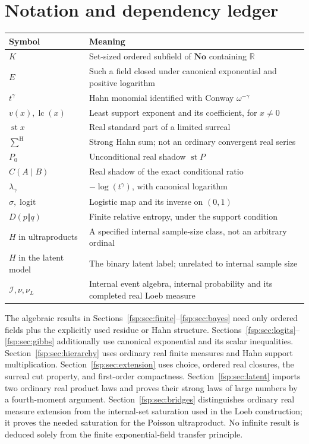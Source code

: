 \documentclass[11pt,a4paper]{article}
\numberwithin{equation}{section}
\theoremstyle{definition}
\theoremstyle{remark}
\newcommand{\R}{\mathbb R}
\newcommand{\No}{\mathbf{No}}
\newcommand{\st}{\operatorname{st}}
\newcommand{\lc}{\operatorname{lc}}
\newcommand{\logit}{\operatorname{logit}}
\newcommand{\hsum}{\mathop{\sum}\nolimits^{\mathrm H}}
\begin{document}
\appendix
\section{Notation and dependency ledger}
\label{fsp:app:ledger}

\begin{center}
\small
\begin{tabularx}{\textwidth}{@{}lX@{}}
\toprule
Symbol & Meaning\\
\midrule
$K$ & Set-sized ordered subfield of $\No$ containing $\R$\\
$E$ & Such a field closed under canonical exponential and positive logarithm\\
$t^\gamma$ & Hahn monomial identified with Conway $\omega^{-\gamma}$\\
$v(x),\lc(x)$ & Least support exponent and its coefficient, for $x\ne0$\\
$\st x$ & Real standard part of a limited surreal\\
$\hsum$ & Strong Hahn sum; not an ordinary convergent real series\\
$P_0$ & Unconditional real shadow $\st P$\\
$C(A\mid B)$ & Real shadow of the exact conditional ratio\\
$\lambda_\gamma$ & $-\log(t^\gamma)$, with canonical logarithm\\
$\sigma,\logit$ & Logistic map and its inverse on $(0,1)$\\
$D(p\Vert q)$ & Finite relative entropy, under the support condition\\
$H$ in ultraproducts & A specified internal sample-size class, not an arbitrary ordinal\\
$H$ in the latent model & The binary latent label; unrelated to internal sample size\\
$\mathcal I,\nu,\nu_L$ & Internal event algebra, internal probability and its completed real Loeb measure\\
\bottomrule
\end{tabularx}
\end{center}

The algebraic results in Sections~\ref{fsp:sec:finite}--\ref{fsp:sec:bayes} need
only ordered fields plus the explicitly used residue or Hahn structure.
Sections~\ref{fsp:sec:logits}--\ref{fsp:sec:gibbs} additionally use canonical
exponential and its scalar inequalities. Section~\ref{fsp:sec:hierarchy}
uses ordinary real finite measures and Hahn support multiplication.
Section~\ref{fsp:sec:extension} uses choice, ordered real closures, the
surreal cut property, and first-order compactness.
Section~\ref{fsp:sec:latent} imports two ordinary real product laws and
proves their strong laws of large numbers by a fourth-moment argument. Section~\ref{fsp:sec:bridges} distinguishes
ordinary real measure extension from the internal-set saturation used in the
Loeb construction; it proves the needed saturation for the Poisson ultraproduct. No infinite result is deduced solely from the finite
exponential-field transfer principle.
\end{document}
